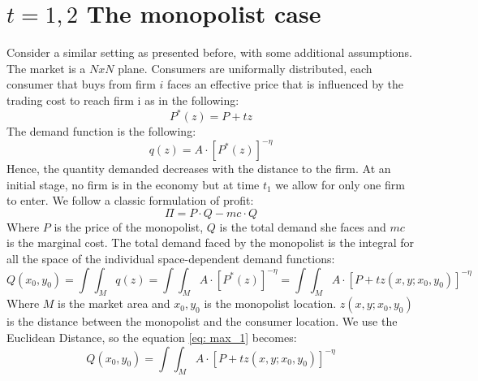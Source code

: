 
\section{$t=1,2$ The monopolist case}
Consider a similar setting as presented before, with some additional assumptions. The market is a $NxN$ plane. Consumers are uniformally distributed, each consumer that buys from firm $i$ faces an effective price that is influenced by the trading cost to reach firm i as in the following:
\begin{equation}
    P^*(z)=P+tz
\end{equation}
The demand function is the following:
\begin{equation}
q(z)=A \cdot\left[P^*(z)\right]^{-\eta}
\end{equation}
Hence, the quantity demanded decreases with the distance to the firm.
At an initial stage, no firm is in the economy but at time $t_1$ we allow for only one firm to enter. 
We follow a classic formulation of profit:
\begin{equation}
    \Pi=P\cdot Q - mc\cdot Q
\end{equation}
Where $P$ is the price of the monopolist, $Q$ is the total demand she faces and $mc$ is the marginal cost.
The total demand faced by the monopolist is the integral for all the space of the individual space-dependent demand functions:
\begin{equation}
    Q(x_0,y_0)=\int\int_M q(z)=\int\int_M A\cdot\left[P^*(z)\right]^{-\eta}=\int\int_M A \cdot\left[P+tz(x,y;x_0,y_0)\right]^{-\eta}
    \label{eq: max_1}
\end{equation}
Where $M$ is the market area and $x_0, y_0$ is the monopolist location.
$z(x,y;x_0,y_0)$ is the distance between the monopolist and the consumer location. We use the Euclidean Distance, so the equation \ref{eq: max_1} becomes:
\begin{equation}
    Q(x_0,y_0)=\int\int_M A \cdot\left[P+tz(x,y;x_0,y_0)\right]^{-\eta}
    \label{eq: max_2}
\end{equation}
